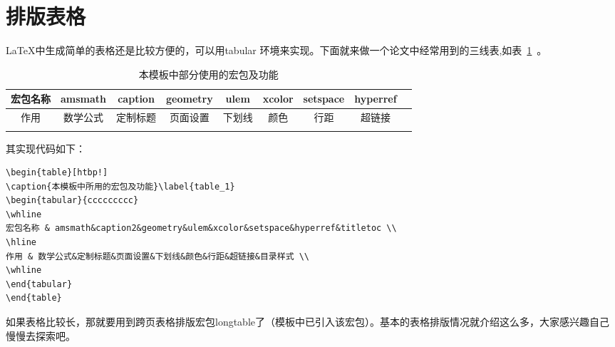 \section{排版表格}
\LaTeX 中生成简单的表格还是比较方便的，可以用tabular 环境来实现。下面就来做一个论文中经常用到的三线表,如表~\ref{table_1}~。

\begin{table}[htbp!]
\centering
\caption{本模板中部分使用的宏包及功能}\label{table_1}

\begin{tabular}{ccccccccc}
\whline 
宏包名称 & amsmath&caption&geometry&ulem&xcolor&setspace&hyperref \\ 
\hline 
作用 & 数学公式&定制标题&页面设置&下划线&颜色&行距&超链接 \\ 
\whline 
\end{tabular}
\end{table}

其实现代码如下：
{\color{green!50!black}
\begin{lstlisting}[breaklines=true,]
\begin{table}[htbp!]
\caption{本模板中所用的宏包及功能}\label{table_1}
\begin{tabular}{ccccccccc}
\whline 
宏包名称 & amsmath&caption2&geometry&ulem&xcolor&setspace&hyperref&titletoc \\ 
\hline 
作用 & 数学公式&定制标题&页面设置&下划线&颜色&行距&超链接&目录样式 \\ 
\whline 
\end{tabular}
\end{table}
\end{lstlisting}
}
如果表格比较长，那就要用到跨页表格排版宏包longtable了（模板中已引入该宏包）。基本的表格排版情况就介绍这么多，大家感兴趣自己慢慢去探索吧。